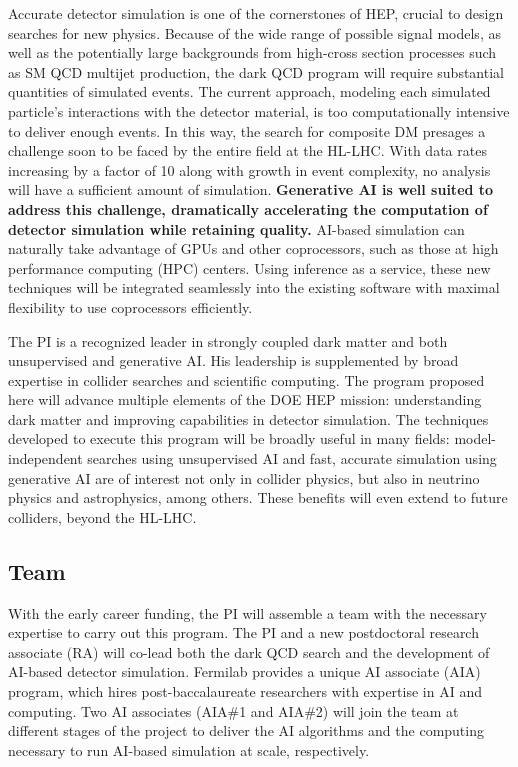 Accurate detector simulation is one of the cornerstones of HEP, crucial to design searches for new physics.
Because of the wide range of possible signal models,
as well as the potentially large backgrounds from high-cross section processes such as SM QCD multijet production,
the dark QCD program will require substantial quantities of simulated events.
The current approach, modeling each simulated particle's interactions with the detector material, is too computationally intensive to deliver enough events.
In this way, the search for composite DM presages a challenge soon to be faced by the entire field at the HL-LHC.
With data rates increasing by a factor of 10 along with growth in event complexity, no analysis will have a sufficient amount of simulation.
\textbf{Generative AI is well suited to address this challenge, dramatically accelerating the computation of detector simulation while retaining quality.}
AI-based simulation can naturally take advantage of GPUs and other coprocessors, such as those at high performance computing (HPC) centers.
Using inference as a service, these new techniques will be integrated seamlessly into the existing software with maximal flexibility to use coprocessors efficiently.

The PI is a recognized leader in strongly coupled dark matter and both unsupervised and generative AI.
His leadership is supplemented by broad expertise in collider searches and scientific computing.
The program proposed here will advance multiple elements of the DOE HEP mission: understanding dark matter and improving capabilities in detector simulation.
The techniques developed to execute this program will be broadly useful in many fields:
model-independent searches using unsupervised AI and fast, accurate simulation using generative AI are of interest
not only in collider physics, but also in neutrino physics and astrophysics, among others.
These benefits will even extend to future colliders, beyond the HL-LHC.

\subsection{Team}\label{subsec:team}

With the early career funding, the PI will assemble a team with the necessary expertise to carry out this program.
The PI and a new postdoctoral research associate (RA) will co-lead both the dark QCD search and the development of AI-based detector simulation.
Fermilab provides a unique AI associate (AIA) program, which hires post-baccalaureate researchers with expertise in AI and computing.
Two AI associates (AIA\#1 and AIA\#2) will join the team at different stages of the project to deliver the AI algorithms and the computing necessary to run AI-based simulation at scale, respectively.

